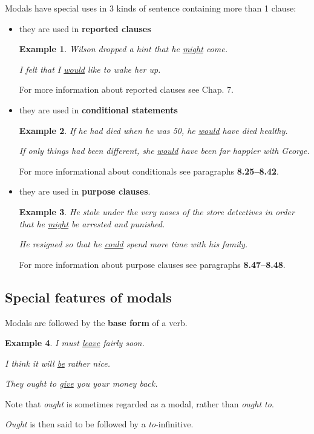 \documentclass[oneside]{book}
\numberwithin{equation}{section}
\newtheorem{example}{Example}[section]
\begin{document}
%
\noindent{} Modals have special uses in 3 kinds of sentence containing more than 1 clause:
\begin{itemize}
    \item they are used in \textbf{reported clauses}
    \begin{example}
        Wilson dropped a hint that he \underline{might} come.
        
        I felt that I \underline{would} like to wake her up.
    \end{example}
    For more information about reported clauses see Chap. 7.
    \item they are used in \textbf{conditional statements}
    \begin{example}
        If he had died when he was 50, he \underline{would} have died healthy.
        
        If only things had been different, she \underline{would} have been far happier with George.
    \end{example}
    For more informational about conditionals see paragraphs \textbf{8.25--8.42}.
    \item they are used in \textbf{purpose clauses}.
    \begin{example}
        He stole under the very noses of the store detectives in order that he \underline{might} be arrested and punished.
        
        He resigned so that he \underline{could} spend more time with his family.
    \end{example}
    For more information about purpose clauses see paragraphs \textbf{8.47--8.48}.
\end{itemize}

\subsection{Special features of modals}
\noindent{} Modals are followed by the \textbf{base form} of a verb.
\begin{example}
    I must \underline{leave} fairly soon.
    
    I think it will \underline{be} rather nice.
    
    They ought to \underline{give} you your money back.
\end{example}
Note that \textit{ought} is sometimes regarded as a modal, rather than \textit{ought to}.

\textit{Ought} is then said to be followed by a \textit{to}-infinitive.
\end{document}
